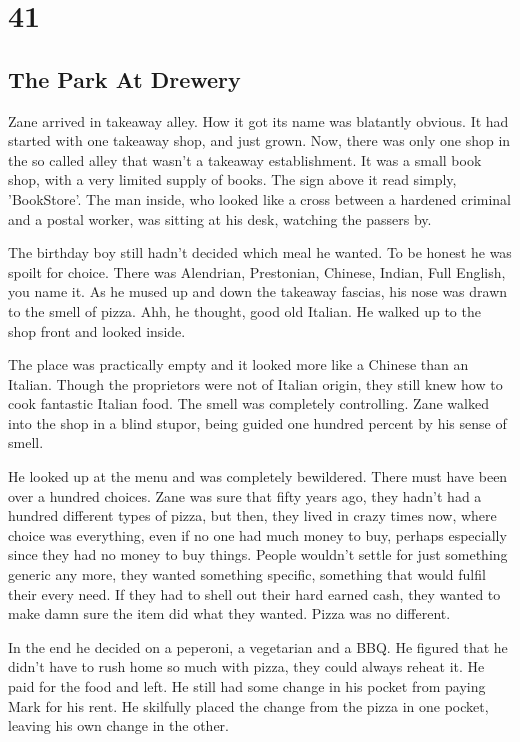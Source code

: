 \chapter{41}
\section{The Park At Drewery}


Zane arrived in takeaway alley.  How it got its name was blatantly obvious.  It had started with one takeaway shop, and just grown.  Now, there was only one shop in the so called alley that wasn't a takeaway establishment.  It was a small book shop, with a very limited supply of books.  The sign above it read simply, 'BookStore'.  The man inside, who looked like a cross between a hardened criminal and a postal worker, was sitting at his desk, watching the passers by.  

The birthday boy still hadn't decided which meal he wanted.  To be honest he was spoilt for choice.  There was Alendrian, Prestonian, Chinese, Indian, Full English, you name it.  As he mused up and down the takeaway fascias, his nose was drawn to the smell of pizza.  Ahh, he thought, good old Italian.  He walked up to the shop front and looked inside.  

The place was practically empty and it looked more like a Chinese than an Italian.  Though the proprietors were not of Italian origin, they still knew how to cook fantastic Italian food.  The smell was completely controlling.  Zane walked into the shop in a blind stupor, being guided one hundred percent by his sense of smell.

He looked up at the menu and was completely bewildered.  There must have been over a hundred choices.  Zane was sure that fifty years ago, they hadn't had a hundred different types of pizza, but then, they lived in crazy times now, where choice was everything, even if no one had much money to buy, perhaps especially since they had no money to buy things.  People wouldn't settle for just something generic any more, they wanted something specific, something that would fulfil their every need.  If they had to shell out their hard earned cash, they wanted to make damn sure the item did what they wanted.  Pizza was no different.

In the end he decided on a peperoni, a vegetarian and a BBQ.  He figured that he didn't have to rush home so much with pizza, they could always reheat it.  He paid for the food and left.  He still had some change in his pocket from paying Mark for his rent.  He skilfully placed the change from the pizza in one pocket, leaving his own change in the other.  

